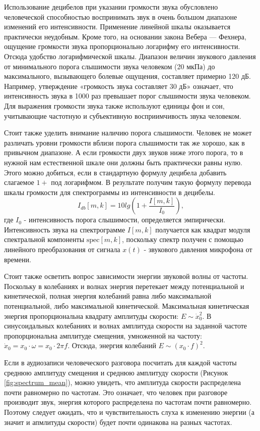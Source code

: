 Использование децибелов при указании громкости звука обусловлено человеческой способностью воспринимать звук в очень большом диапазоне изменений его интенсивности. 
Применение линейной шкалы оказывается практически неудобным. Кроме того, на основании закона Вебера — Фехнера, 
ощущение громкости звука пропорционально логарифму его интенсивности. Отсюда удобство логарифмической шкалы. 
Диапазон величин звукового давления от минимального порога слышимости звука человеком (20 мкПа) до максимального, 
вызывающего болевые ощущения, составляет примерно 120 дБ. 
Например, утверждение «громкость звука составляет 30 дБ» означает, что интенсивность звука в 1000 раз превышает порог слышимости звука человеком.
Для выражения громкости звука также используют единицы фон и сон, учитывающие частотную и субъективную восприимчивость звука человеком.

Стоит также уделить внимание наличию порога слышимости. Человек не может различать уровни громкости вблизи порога слышимости так же хорошо, 
как в привычном диапазоне. А если громкости двух звуков ниже этого порога, то в нужной нам естественной шкале они должны быть практически равны нулю.
Этого можно добиться, если в стандартную формулу децибела добавить слагаемое $1 +$ под логарифмом. 
В результате получим такую формулу перевода шкалы громкости для спектрограммы из интенсивности в децибелы.
\begin{equation}
  I_{db}[m, k] = 10 lg(1 + \frac{I[m, k]}{I_0}),
\end{equation}
где $I_0$ - интенсивность порога слышимости, определяется эмпирически. Интенсивность звука на спектрограмме $I[m,k]$ получается как 
квадрат модуля спектральной компоненты $\mathrm{spec}[m,k]$, поскольку спектр получен с помощью линейного преобразования от сигнала 
$x(t)$ - звукового давления микрофона от времени.

Стоит также осветить вопрос зависимости энергии звуковой волны от частоты. Поскольку в колебаниях и волнах энергия перетекает между потенциальной и кинетической,
полная энергия колебаний равна либо максимальной потенциальной, либо максимальной кинетической. 
Максимальная кинетическая энергия пропорциональна квадрату амплитуды скорости: $E \sim \dot{x}_0^2$. 
В синусоидальных колебаниях и волнах амплитуда скорости на заданной частоте пропорциональна амплитуде смещения, 
умноженной на частоту: $\dot{x}_0 = x_0 \cdot \omega = x_0 \cdot 2\pi f$. 
Отсюда, энергия колебаний $E \sim (x_0 \cdot f)^2$.

Если в аудиозаписи человеческого разговора посчитать для каждой частоты среднюю амплитуду смещения и среднюю амплитуду скорости (Рисунок \ref{fig:spectrum_mean}), 
можно увидеть, что амплитуда скорости распределена почти равномерно по частотам. Это означает, что человек при разговоре производит звук, 
энергия которого распределена по частотам почти равномерно. Поэтому следует ожидать, 
что и чувствительность слуха к изменению энергии (а значит и апмлитуды скорости) будет почти одинакова на разных частотах.

